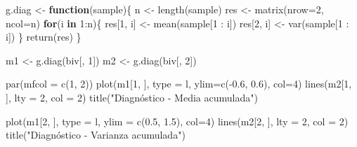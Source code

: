 \documentclass[
  10pt,
  spanish,
]{book}
\newenvironment{Shaded}{\begin{snugshade}}{\end{snugshade}}
\newcommand{\AttributeTok}[1]{\textcolor[rgb]{0.77,0.63,0.00}{#1}}
\newcommand{\ControlFlowTok}[1]{\textcolor[rgb]{0.13,0.29,0.53}{\textbf{#1}}}
\newcommand{\DecValTok}[1]{\textcolor[rgb]{0.00,0.00,0.81}{#1}}
\newcommand{\FloatTok}[1]{\textcolor[rgb]{0.00,0.00,0.81}{#1}}
\newcommand{\FunctionTok}[1]{\textcolor[rgb]{0.00,0.00,0.00}{#1}}
\newcommand{\NormalTok}[1]{#1}
\newcommand{\OtherTok}[1]{\textcolor[rgb]{0.56,0.35,0.01}{#1}}
\newcommand{\SpecialCharTok}[1]{\textcolor[rgb]{0.00,0.00,0.00}{#1}}
\newcommand{\StringTok}[1]{\textcolor[rgb]{0.31,0.60,0.02}{#1}}
\theoremstyle{definition}
\theoremstyle{definition}
\theoremstyle{definition}
\theoremstyle{definition}
\theoremstyle{remark}
\begin{document}
\begin{Shaded}
\begin{Highlighting}[]
\NormalTok{g.diag }\OtherTok{\textless{}{-}} \ControlFlowTok{function}\NormalTok{(sample)\{}
\NormalTok{  n }\OtherTok{\textless{}{-}} \FunctionTok{length}\NormalTok{(sample) }
\NormalTok{  res }\OtherTok{\textless{}{-}} \FunctionTok{matrix}\NormalTok{(}\AttributeTok{nrow=}\DecValTok{2}\NormalTok{, }\AttributeTok{ncol=}\NormalTok{n)}
  \ControlFlowTok{for}\NormalTok{(i }\ControlFlowTok{in} \DecValTok{1}\SpecialCharTok{:}\NormalTok{n)\{}
\NormalTok{    res[}\DecValTok{1}\NormalTok{, i] }\OtherTok{\textless{}{-}} \FunctionTok{mean}\NormalTok{(sample[}\DecValTok{1} \SpecialCharTok{:}\NormalTok{ i])}
\NormalTok{    res[}\DecValTok{2}\NormalTok{, i] }\OtherTok{\textless{}{-}} \FunctionTok{var}\NormalTok{(sample[}\DecValTok{1} \SpecialCharTok{:}\NormalTok{ i])}
\NormalTok{  \}}
  \FunctionTok{return}\NormalTok{(res)}
\NormalTok{\}}

\NormalTok{m1 }\OtherTok{\textless{}{-}} \FunctionTok{g.diag}\NormalTok{(biv[, }\DecValTok{1}\NormalTok{])}
\NormalTok{m2 }\OtherTok{\textless{}{-}} \FunctionTok{g.diag}\NormalTok{(biv[, }\DecValTok{2}\NormalTok{])}

\FunctionTok{par}\NormalTok{(}\AttributeTok{mfcol =} \FunctionTok{c}\NormalTok{(}\DecValTok{1}\NormalTok{, }\DecValTok{2}\NormalTok{))}
\FunctionTok{plot}\NormalTok{(m1[}\DecValTok{1}\NormalTok{, ], }\AttributeTok{type =} \StringTok{\textquotesingle{}l\textquotesingle{}}\NormalTok{, }\AttributeTok{ylim=}\FunctionTok{c}\NormalTok{(}\SpecialCharTok{{-}}\FloatTok{0.6}\NormalTok{, }\FloatTok{0.6}\NormalTok{), }\AttributeTok{col=}\DecValTok{4}\NormalTok{)}
\FunctionTok{lines}\NormalTok{(m2[}\DecValTok{1}\NormalTok{, ], }\AttributeTok{lty =} \DecValTok{2}\NormalTok{, }\AttributeTok{col =} \DecValTok{2}\NormalTok{)}
\FunctionTok{title}\NormalTok{(}\StringTok{"Diagnóstico {-} Media acumulada"}\NormalTok{)}

\FunctionTok{plot}\NormalTok{(m1[}\DecValTok{2}\NormalTok{, ], }\AttributeTok{type =} \StringTok{\textquotesingle{}l\textquotesingle{}}\NormalTok{, }\AttributeTok{ylim =} \FunctionTok{c}\NormalTok{(}\FloatTok{0.5}\NormalTok{, }\FloatTok{1.5}\NormalTok{), }\AttributeTok{col=}\DecValTok{4}\NormalTok{)}
\FunctionTok{lines}\NormalTok{(m2[}\DecValTok{2}\NormalTok{, ], }\AttributeTok{lty =} \DecValTok{2}\NormalTok{, }\AttributeTok{col =} \DecValTok{2}\NormalTok{)}
\FunctionTok{title}\NormalTok{(}\StringTok{"Diagnóstico {-} Varianza acumulada"}\NormalTok{)}
\end{Highlighting}
\end{Shaded}
\end{document}
